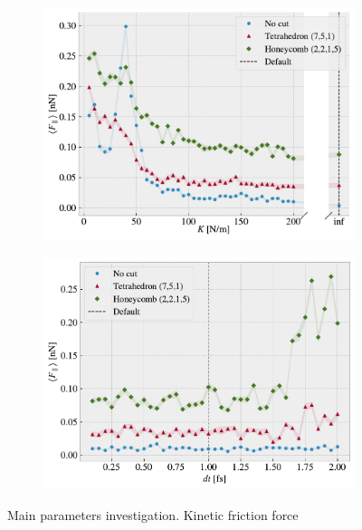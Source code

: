 \begin{figure}[H]
\begin{subfigure}[t]{0.49\textwidth}
      \centering
      \includegraphics[width=\textwidth]{figures/baseline/variables_spring_mean_fixmove.pdf}
      \caption{}
      \label{fig:var_K}
    \end{subfigure}
    \hfill
    \begin{subfigure}[t]{0.49\textwidth}
        \centering
        \includegraphics[width=\textwidth]{figures/baseline/variables_dt_mean_fixmove.pdf}
        \caption{}
        \label{fig:var_dt}
    \end{subfigure}
    \hfill
    \caption{Main parameters investigation. Kinetic friction force}
    \label{fig:main_param}
\end{figure}

